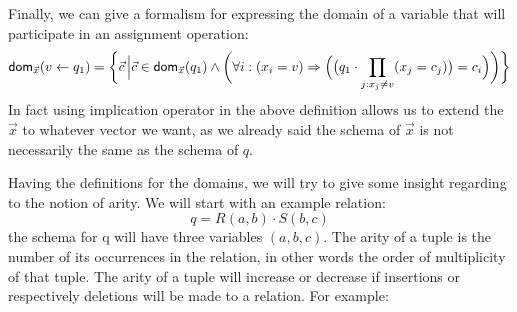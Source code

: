 \documentclass[12pt]{article}
\begin{document}
Finally, we can give a formalism for expressing the domain of a variable that will participate in an assignment operation:
\begin{equation*}
\text{\textsf{dom}{}}_{\vec{x}}(v\gets q_{1})=\bigg\{\vec{c}\,\Big|\vec{c}\in\text{\textsf{dom}{}}_{\vec{x}}(q_{1})\land \bigg(\forall i:(x_{i}=v)\Rightarrow\Big(\big(q_{1}\cdot\prod_{j:x_{j}\neq v } (x_{j}=c_{j})\big)=c_{i}\Big)\bigg)\bigg\}
\end{equation*}
In fact using implication operator in the above definition allows us to extend the $\vec{x}$ to whatever vector we want, as we already said the schema of $\vec{x}$ is not necessarily the same as the schema of $q$. \\
\par
Having the definitions for the domains, we will try to give some insight regarding to the notion of arity. We will start with an example relation: $$q=R(a,b)\cdot S(b,c)$$ the schema for q will have three variables $(a,b,c)$. The arity of a tuple is the number of its occurrences in the relation, in other words the order of multiplicity of that tuple. The arity of a tuple will increase or decrease if insertions or respectively deletions will be made to a relation. For example:
\end{document}
